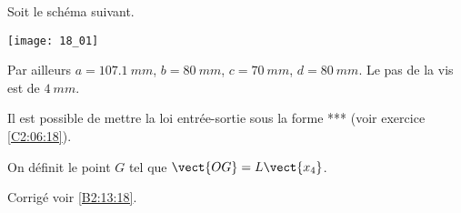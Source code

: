\normalfalse \difficilefalse \tdifficiletrue
\correctionfalse


\setcounter{question}{0}
\ifcorrection
\else
{}
\fi

\ifprof
\else

Soit le schéma suivant. 
\begin{center}
\texttt{[image: 18\_01]}
\end{center}
\fi

Par ailleurs $a=\SI{107,1}{mm}$, $b=\SI{80}{mm}$, $c=\SI{70}{mm}$, $d=\SI{80}{mm}$. Le pas de la vis est de $\SI{4}{mm}$.


Il est possible de mettre la loi entrée-sortie sous la forme *** (voir exercice \ref{C2:06:18}).

On définit le point $G$ tel que $\vect{OG}=L\vect{x_4}$.

\ifprof
\else
\fi

\ifprof
\else
\fi


\ifprof
\else
\begin{flushright}
\footnotesize{Corrigé  voir \ref{B2:13:18}.}
\end{flushright}%
\fi